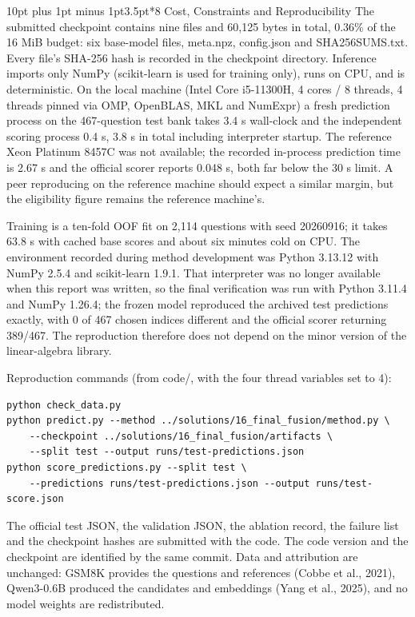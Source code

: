 \documentclass[10pt,a4paper]{article}
\makeatletter
\renewcommand\section{\@startsection{section}{1}{\z@}%
  {10pt plus 1pt minus 1pt}{3.5pt}{\normalfont\large\bfseries}}
\makeatother
\begin{document}
\section*{8 Cost, Constraints and Reproducibility}
The submitted checkpoint contains nine files and 60,125 bytes in total, 0.36\% of the 16 MiB budget: six base-model files, meta.npz, config.json and SHA256SUMS.txt. Every file’s SHA-256 hash is recorded in the checkpoint directory. Inference imports only NumPy (scikit-learn is used for training only), runs on CPU, and is deterministic. On the local machine (Intel Core i5-11300H, 4 cores / 8 threads, 4 threads pinned via OMP, OpenBLAS, MKL and NumExpr) a fresh prediction process on the 467-question test bank takes 3.4 s wall-clock and the independent scoring process 0.4 s, 3.8 s in total including interpreter startup. The reference Xeon Platinum 8457C was not available; the recorded in-process prediction time is 2.67 s and the official scorer reports 0.048 s, both far below the 30 s limit. A peer reproducing on the reference machine should expect a similar margin, but the eligibility figure remains the reference machine’s.

Training is a ten-fold OOF fit on 2,114 questions with seed 20260916; it takes 63.8 s with cached base scores and about six minutes cold on CPU. The environment recorded during method development was Python 3.13.12 with NumPy 2.5.4 and scikit-learn 1.9.1. That interpreter was no longer available when this report was written, so the final verification was run with Python 3.11.4 and NumPy 1.26.4; the frozen model reproduced the archived test predictions exactly, with 0 of 467 chosen indices different and the official scorer returning 389/467. The reproduction therefore does not depend on the minor version of the linear-algebra library.

Reproduction commands (from code/, with the four thread variables set to 4):

\par\noindent\begin{minipage}{\textwidth}
\begin{verbatim}
python check_data.py
python predict.py --method ../solutions/16_final_fusion/method.py \
    --checkpoint ../solutions/16_final_fusion/artifacts \
    --split test --output runs/test-predictions.json
python score_predictions.py --split test \
    --predictions runs/test-predictions.json --output runs/test-score.json
\end{verbatim}
\end{minipage}\par
\vspace{2pt}
The official test JSON, the validation JSON, the ablation record, the failure list and the checkpoint hashes are submitted with the code. The code version and the checkpoint are identified by the same commit. Data and attribution are unchanged: GSM8K provides the questions and references (Cobbe et al., 2021), Qwen3-0.6B produced the candidates and embeddings (Yang et al., 2025), and no model weights are redistributed.
\end{document}
